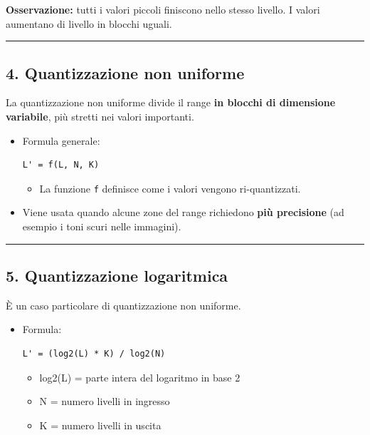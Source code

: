 \documentclass[
]{article}
\providecommand{\tightlist}{%
  \setlength{\itemsep}{0pt}\setlength{\parskip}{0pt}}
\begin{document}
\textbf{Osservazione:} tutti i valori piccoli finiscono nello stesso livello. I valori aumentano di livello in blocchi uguali.

\begin{center}\rule{0.5\linewidth}{0.5pt}\end{center}

\hypertarget{quantizzazione-non-uniforme}{%
\subsection{4. Quantizzazione non uniforme}\label{quantizzazione-non-uniforme}}

La quantizzazione non uniforme divide il range \textbf{in blocchi di dimensione variabile}, più stretti nei valori importanti.

\begin{itemize}
\item
  Formula generale:

\begin{verbatim}
L' = f(L, N, K)
\end{verbatim}

  \begin{itemize}
  \tightlist
  \item
    La funzione \texttt{f} definisce come i valori vengono ri-quantizzati.
  \end{itemize}
\item
  Viene usata quando alcune zone del range richiedono \textbf{più precisione} (ad esempio i toni scuri nelle immagini).
\end{itemize}

\begin{center}\rule{0.5\linewidth}{0.5pt}\end{center}

\hypertarget{quantizzazione-logaritmica}{%
\subsection{5. Quantizzazione logaritmica}\label{quantizzazione-logaritmica}}

È un caso particolare di quantizzazione non uniforme.

\begin{itemize}
\item
  Formula:

\begin{verbatim}
L' = (log2(L) * K) / log2(N)
\end{verbatim}

  \begin{itemize}
  \tightlist
  \item
    log2(L) = parte intera del logaritmo in base 2
  \item
    N = numero livelli in ingresso
  \item
    K = numero livelli in uscita
  \end{itemize}
\end{itemize}
\end{document}
